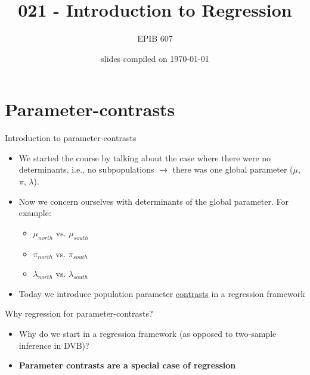 \documentclass[10pt,handout]{beamer}\usepackage[]{graphicx}\usepackage[]{color}
\begin{document}
	
	
	


	\title{021 - Introduction to Regression}
\author{EPIB 607}

\date{slides compiled on \today}

\maketitle


\section{Parameter-contrasts}

\begin{frame}{Introduction to parameter-contrasts}
	
	\begin{itemize}
		\setlength\itemsep{2em}
		\item We started the course by talking about the case where there were no determinants, i.e., no subpopulations $\to$ there was one global parameter ($\mu$, $\pi$, $\lambda$). \pause 
		\item Now we concern ourselves with determinants of the global parameter. For example:
		\begin{itemize}
			\item $\mu_{north}$ vs. $\mu_{south}$
			\item $\pi_{north}$ vs. $\pi_{south}$
			\item $\lambda_{north}$ vs. $\lambda_{south}$
		\end{itemize}
		
		\item Today we introduce population parameter \underline{contrasts} in a regression framework
		
	\end{itemize}
	
\end{frame}


\begin{frame}{Why regression for parameter-contrasts?}
	
	\begin{itemize}
		\setlength\itemsep{1.5em}
		\item Why do we start in a regression framework (as opposed to two-sample inference in DVB)?  
		\item \textbf{Parameter contrasts are a special case of regression}  
	\end{itemize}
	
\end{frame}
\end{document}
